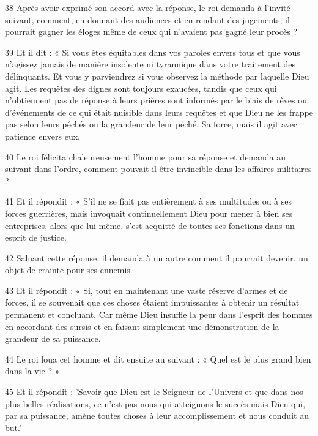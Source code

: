 \par 38 Après avoir exprimé son accord avec la réponse, le roi demanda à l'invité suivant, comment, en donnant des audiences et en rendant des jugements, il pourrait gagner les éloges même de ceux qui n'avaient pas gagné leur procès ?

\par 39 Et il dit : « Si vous êtes équitables dans vos paroles envers tous et que vous n'agissez jamais de manière insolente ni tyrannique dans votre traitement des délinquants. Et vous y parviendrez si vous observez la méthode par laquelle Dieu agit. Les requêtes des dignes sont toujours exaucées, tandis que ceux qui n'obtiennent pas de réponse à leurs prières sont informés par le biais de rêves ou d'événements de ce qui était nuisible dans leurs requêtes et que Dieu ne les frappe pas selon leurs péchés ou la grandeur de leur péché. Sa force, mais il agit avec patience envers eux.

\par 40 Le roi félicita chaleureusement l'homme pour sa réponse et demanda au suivant dans l'ordre, comment pouvait-il être invincible dans les affaires militaires ?

\par 41 Et il répondit : « S'il ne se fiait pas entièrement à ses multitudes ou à ses forces guerrières, mais invoquait continuellement Dieu pour mener à bien ses entreprises, alors que lui-même. s'est acquitté de toutes ses fonctions dans un esprit de justice.

\par 42 Saluant cette réponse, il demanda à un autre comment il pourrait devenir. un objet de crainte pour ses ennemis.

\par 43 Et il répondit : « Si, tout en maintenant une vaste réserve d'armes et de forces, il se souvenait que ces choses étaient impuissantes à obtenir un résultat permanent et concluant. Car même Dieu insuffle la peur dans l'esprit des hommes en accordant des sursis et en faisant simplement une démonstration de la grandeur de sa puissance.

\par 44 Le roi loua cet homme et dit ensuite au suivant : « Quel est le plus grand bien dans la vie ? »

\par 45 Et il répondit : 'Savoir que Dieu est le Seigneur de l'Univers et que dans nos plus belles réalisations, ce n'est pas nous qui atteignons le succès mais Dieu qui, par sa puissance, amène toutes choses à leur accomplissement et nous conduit au but.'

